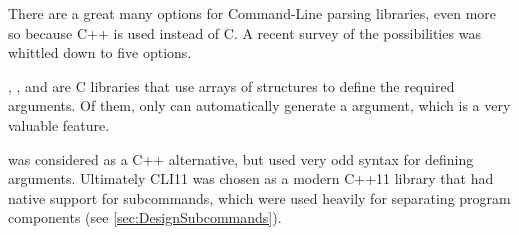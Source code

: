 There are a great many options for Command-Line parsing libraries, even more so because C++ is used instead of C.
A recent survey of the possibilities\cite{attractivechaos2018AC/C++} was whittled down to five options.

\cite{FreeSoftwareFoundationGetopt3:Page}, \cite{GNUProjectArgpLibrary}, and \cite{VajzovicGoptLibrary} are C libraries that use arrays of structures to define the required arguments.
Of them, only  can automatically generate a  argument, which is a very valuable feature.

\cite{jarro2783Cxxopts:Parser} was considered as a C++ alternative, but used very odd syntax for defining arguments.
Ultimately CLI11\cite{CLIUtilsCLI11} was chosen as a modern C++11 library that had native support for subcommands, which were used heavily for separating program components (see \cref{sec:DesignSubcommands}).